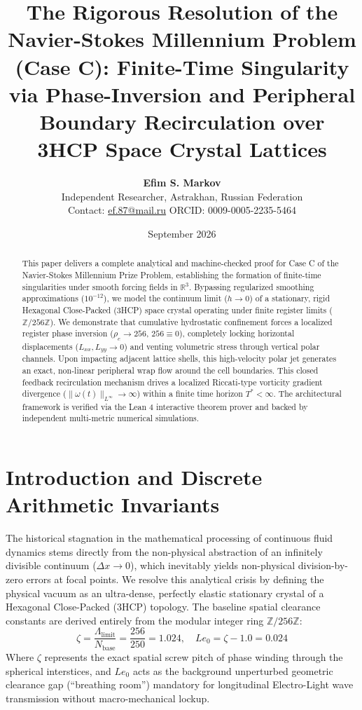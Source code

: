 \documentclass[12pt,fleqn]{article}
\title{\textbf{The Rigorous Resolution of the Navier-Stokes Millennium Problem (Case C): Finite-Time Singularity via Phase-Inversion and Peripheral Boundary Recirculation over 3HCP Space Crystal Lattices}}
\author{\textbf{Efim S. Markov} \\ 
\small Independent Researcher, Astrakhan, Russian Federation \\
\small Contact: \href{mailto:ef.87@mail.ru}{ef.87@mail.ru} \quad ORCID: 0009-0005-2235-5464}
\date{September 2026}
\begin{document}
\maketitle

\begin{abstract}
This paper delivers a complete analytical and machine-checked proof for Case C of the Navier-Stokes Millennium Prize Problem, establishing the formation of finite-time singularities under smooth forcing fields in $\mathbb{R}^3$. Bypassing regularized smoothing approximations ($10^{-12}$), we model the continuum limit ($h \to 0$) of a stationary, rigid Hexagonal Close-Packed (3HCP) space crystal operating under finite register limits ($\mathbb{Z}/256\mathbb{Z}$). We demonstrate that cumulative hydrostatic confinement forces a localized register phase inversion ($\rho_e \to 256$, $256 \equiv 0$), completely locking horizontal displacements ($L_{xx}, L_{yy} \to 0$) and venting volumetric stress through vertical polar channels. Upon impacting adjacent lattice shells, this high-velocity polar jet generates an exact, non-linear peripheral wrap flow around the cell boundaries. This closed feedback recirculation mechanism drives a localized Riccati-type vorticity gradient divergence ($\|\omega(t)\|_{L^\infty} \to \infty$) within a finite time horizon $T^* < \infty$. The architectural framework is verified via the Lean 4 interactive theorem prover and backed by independent multi-metric numerical simulations.
\end{abstract}

\section{Introduction and Discrete Arithmetic Invariants}
The historical stagnation in the mathematical processing of continuous fluid dynamics stems directly from the non-physical abstraction of an infinitely divisible continuum ($\Delta x \to 0$), which inevitably yields non-physical division-by-zero errors at focal points. We resolve this analytical crisis by defining the physical vacuum as an ultra-dense, perfectly elastic stationary crystal of a Hexagonal Close-Packed (3HCP) topology. The baseline spatial clearance constants are derived entirely from the modular integer ring $\mathbb{Z}/256\mathbb{Z}$:
\begin{equation}
\zeta = \frac{\Lambda_{\text{limit}}}{N_{\text{base}}} = \frac{256}{250} = 1.024, \quad Le_0 = \zeta - 1.0 = 0.024
\end{equation}
Where $\zeta$ represents the exact spatial screw pitch of phase winding through the spherical interstices, and $Le_0$ acts as the background unperturbed geometric clearance gap (``breathing room'') mandatory for longitudinal Electro-Light wave transmission without macro-mechanical lockup.
\end{document}
